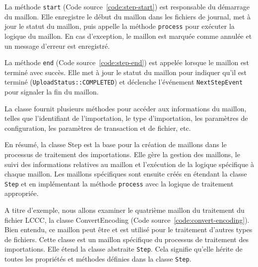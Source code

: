 La méthode \Verb|start| (Code source~\ref{code:step-start}) est responsable du démarrage du maillon. Elle enregistre le début du maillon dans les fichiers de journal, met à jour le statut du maillon, puis appelle la méthode \Verb|process| pour exécuter la logique du maillon. En cas d'exception, le maillon est marquée comme annulée et un message d'erreur est enregistré.


La méthode \Verb|end| (Code source~\ref{code:step-end}) est appelée lorsque le maillon est terminé avec succès. Elle met à jour le statut du maillon pour indiquer qu'il est terminé (\Verb|UploadStatus::COMPLETED|) et déclenche l'événement \Verb|NextStepEvent| pour signaler la fin du maillon.


La classe fournit plusieurs méthodes pour accéder aux informations du maillon, telles que l'identifiant de l'importation, le type d'importation, les paramètres de configuration, les paramètres de transaction et de fichier, etc.

En résumé, la classe Step est la base pour la création de maillons dans le processus de traitement des importations. Elle gère la gestion des maillons, le suivi des informations relatives au maillon et l'exécution de la logique spécifique à chaque maillon. Les maillons spécifiques sont ensuite créés en étendant la classe \Verb|Step| et en implémentant la méthode \Verb|process| avec la logique de traitement appropriée.

A titre d'exemple, nous allons examiner le quatrième maillon du traitement du fichier LCCC, la classe ConvertEncoding (Code source~\ref{code:convert-encoding}). Bien entendu, ce maillon peut être et est utilisé pour le traitement d'autres types de fichiers. Cette classe est un maillon spécifique du processus de traitement des importations. Elle étend la classe abstraite \Verb|Step|. Cela signifie qu'elle hérite de toutes les propriétés et méthodes définies dans la classe \Verb|Step|.

